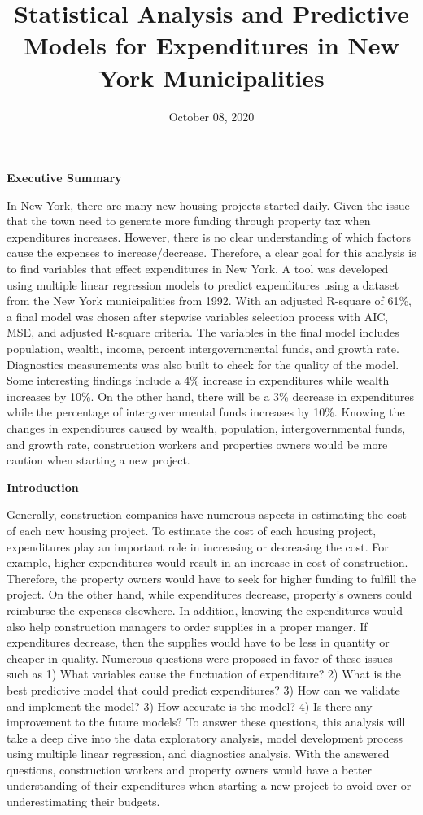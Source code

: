 \documentclass[11pt]{article}\usepackage[]{graphicx}\usepackage[]{color}
\title{Statistical Analysis and Predictive Models for Expenditures in New York Municipalities\vspace{-5ex}}
\date{October 08, 2020\vspace{-5ex}}
\begin{document}
 
\maketitle
\hfill \break








\noindent\textbf{Executive Summary} 

\noindent In New York, there are many new housing projects started daily. Given the issue that the town need to generate more funding through property tax when expenditures increases. However, there is no clear understanding of which factors cause the expenses to increase/decrease. Therefore, a clear goal for this analysis is to find variables that effect expenditures in New York. A tool was developed using multiple linear regression models to predict expenditures using a dataset from the New York municipalities from 1992. With an adjusted R-square of 61\%, a final model was chosen after stepwise variables selection process with AIC, MSE, and adjusted R-square criteria. The variables in the final model includes population, wealth, income, percent intergovernmental funds, and growth rate. Diagnostics measurements was also built to check for the quality of the model. Some interesting findings include a 4\% increase in expenditures while wealth increases by 10\%. On the other hand, there will be a 3\% decrease in expenditures while the percentage of intergovernmental funds increases by 10\%. Knowing the changes in expenditures caused by wealth, population, intergovernmental funds, and growth rate, construction workers and properties owners would be more caution when starting a new project.            
\hfill \break

\noindent\textbf{Introduction} 

\noindent Generally, construction companies have numerous aspects in estimating the cost of each new housing project. To estimate the cost of each housing project, expenditures play an important role in increasing or decreasing the cost. For example, higher expenditures would result in an increase in cost of construction. Therefore, the property owners would have to seek for higher funding to fulfill the project. On the other hand, while expenditures decrease, property’s owners could reimburse the expenses elsewhere. In addition, knowing the expenditures would also help construction managers to order supplies in a proper manger. If expenditures decrease, then the supplies would have to be less in quantity or cheaper in quality. Numerous questions were proposed in favor of these issues such as 1) What variables cause the fluctuation of expenditure? 2) What is the best predictive model that could predict expenditures? 3) How can we validate and implement the model? 3) How accurate is the model? 4) Is there any improvement to the future models? To answer these questions, this analysis will take a deep dive into the data exploratory analysis, model development process using multiple linear regression, and diagnostics analysis. With the answered questions, construction workers and property owners would have a better understanding of their expenditures when starting a new project to avoid over or underestimating their budgets.
\hfill \break
\end{document}

